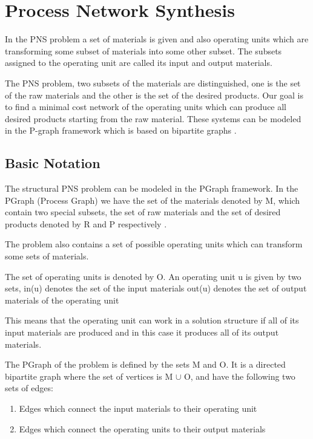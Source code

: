 




\section{Process Network Synthesis}

In the PNS problem a set of materials is given and also operating units 
which are transforming some subset of materials into some other subset. 
The subsets assigned to the operating unit are called its input and output materials\cite{pns3, pns1}.

The PNS problem, two subsets of the materials are distinguished, 
one is the set of the raw materials and the other is the set of the desired products. 
Our goal is to find a minimal cost network of the operating units which can produce all desired products starting from the raw material. 
These systems can be modeled in the P-graph framework which is based on bipartite graphs \cite{pns6 ,pns3}. 

\subsection{Basic Notation}

The structural PNS problem can be modeled in the PGraph framework.
In the PGraph (Process Graph) we have the set of the materials denoted by M,
which contain two special subsets, the set of raw materials and the set of 
desired products denoted by R and P respectively \cite{pns3}.

The problem also contains a set of possible operating units which can transform some sets of materials. 

The set of operating units is denoted by O. An operating unit u is given by two sets, 
in(u) denotes the set of the input materials out(u) denotes the set of output materials of the operating unit

This means that the operating unit can work in a solution structure if all of its input materials are produced and in this case it 
produces all of its output materials\cite{pns3 ,pns1}. 

The PGraph  of the problem is defined by the sets M and O. It is a directed bipartite graph where the set of vertices is M $\cup$ O, and have the following two sets of edges:
\begin{enumerate}
\item Edges which connect the input materials to their operating unit
\item Edges which connect the operating units to their output materials
\end{enumerate}

